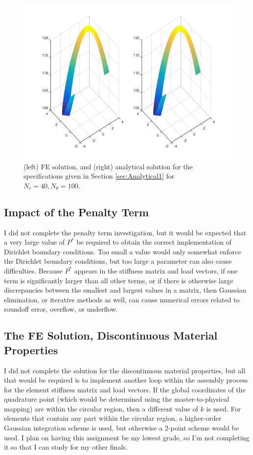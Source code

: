 \documentclass[10pt]{article}
\begin{document}
\begin{figure}[H]
  \centering
  \includegraphics[width=15cm]{Soln1.jpg}
  \caption{(left) FE solution, and (right) analytical solution for the specifications given in Section \ref{sec:Analytical1} for \(N_r=40, N_\theta=100\).}
  \label{fig:Mesh}
\end{figure}

\subsection{Impact of the Penalty Term}

I did not complete the penalty term investigation, but it would be expected that a very large value of \(P^{*}\) be required to obtain the correct implementation of Dirichlet boundary conditions. Too small a value would only somewhat enforce the Dirichlet boundary conditions, but too large a parameter can also cause difficulties. Because \(P^{*}\) appears in the stiffness matrix and load vectors, if one term is significantly larger than all other terms, or if there is otherwise large discrepancies between the smallest and largest values in a matrix, then Gaussian elimination, or iterative methods as well, can cause numerical errors related to roundoff error, overflow, or underflow.

\subsection{The FE Solution, Discontinuous Material Properties}

I did not complete the solution for the discontinuous material properties, but all that would be required is to implement another loop within the assembly process for the element stiffness matrix and load vectors. If the global coordinates of the quadrature point (which would be determined using the master-to-physical mapping) are within the circular region, then a different value of \(k\) is used. For elements that contain any part within the circular region, a higher-order Gaussian integration scheme is used, but otherwise a 2-point scheme would be used. I plan on having this assignment be my lowest grade, so I'm not completing it so that I can study for my other finals. 
\end{document}
